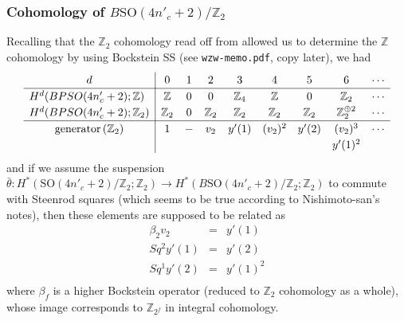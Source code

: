 \documentclass[12pt]{article}
\numberwithin{equation}{section}
\def\bZ{\mathbb{Z}}
\def\SO{\mathrm{SO}}
\begin{document}
\subsubsection{Cohomology of $B\SO(4n'_c+2)/\bZ_2$}
Recalling that the $\bZ_2$ cohomology read off from \cite{KonoMimura1974}
allowed us to determine the $\bZ$ cohomology by using Bockstein SS
(see \texttt{wzw-memo.pdf}, copy later), we had
\begin{equation}
	\renewcommand{\arraystretch}{1.2}
	\begin{array}{c|cccccccccccccccc}
		d & 0 & 1 & 2 & 3 & 4 & 5 & 6 & \cdots \\
		\hline
		\multicolumn{1}{l|}{H^d(BPSO(4n'_c+2);\bZ)} & \bZ & 0 & 0 & \bZ_4 & \bZ & 0 & \bZ_2 & \cdots\\
		\multicolumn{1}{l|}{H^d(BPSO(4n'_c+2);\bZ_2)} & \bZ_2 & 0 & \bZ_2 & \bZ_2 & \bZ_2 & \bZ_2 & \bZ_2^{\oplus 2} & \cdots\\
		\hline
		\text{generator} \,(\bZ_2) & 1 & - & v_2 & y'(1) & (v_2)^2 & y'(2) & (v_2)^3 & \cdots\\
		&&&&&&& y'(1)^2\\
	\end{array}
\end{equation}
and if we assume the suspension $\bar\theta: H^\ast(\SO(4n'_c+2)/\bZ_2;\bZ_2) \to H^\ast(B\SO(4n'_c+2)/\bZ_2;\bZ_2)$
to commute with Steenrod squares (which seems to be true according to Nishimoto-san's notes),
then these elements are supposed to be related as
\begin{equation*}
	\begin{array}{ccl}
		\beta_2 v_2 & = & y'(1)\\
		Sq^2 y'(1) & = & y'(2)\\
		Sq^1 y'(2) & = & y'(1)^2\\
	\end{array}
\end{equation*}
where $\beta_f$ is a higher Bockstein operator (reduced to $\bZ_2$ cohomology as a whole),
whose image corresponds to $\bZ_{2^f}$ in integral cohomology.
\end{document}
